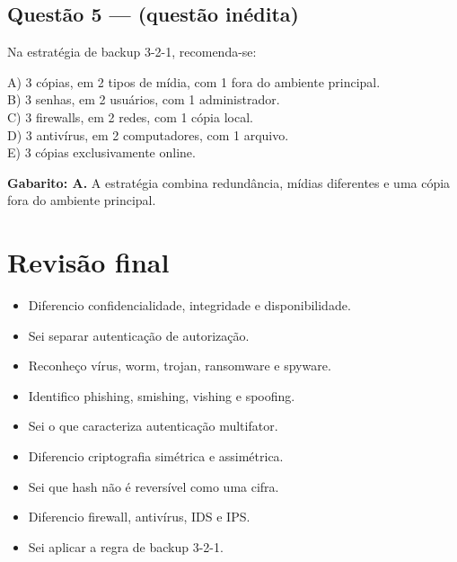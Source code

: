\documentclass[11pt,a4paper]{article}
\begin{document}
\subsection*{Questão 5 — (questão inédita)}

Na estratégia de backup 3-2-1, recomenda-se:

A) 3 cópias, em 2 tipos de mídia, com 1 fora do ambiente principal. \\ B) 3 senhas, em 2 usuários, com 1 administrador. \\ C) 3 firewalls, em 2 redes, com 1 cópia local. \\ D) 3 antivírus, em 2 computadores, com 1 arquivo. \\ E) 3 cópias exclusivamente online.

\begin{alerta}
\textbf{Gabarito: A.} A estratégia combina redundância, mídias diferentes e uma cópia fora do ambiente principal.
\end{alerta}

\section*{Revisão final}

\begin{itemize}
  \item[$\square$] Diferencio confidencialidade, integridade e disponibilidade.
  \item[$\square$] Sei separar autenticação de autorização.
  \item[$\square$] Reconheço vírus, worm, trojan, ransomware e spyware.
  \item[$\square$] Identifico phishing, smishing, vishing e spoofing.
  \item[$\square$] Sei o que caracteriza autenticação multifator.
  \item[$\square$] Diferencio criptografia simétrica e assimétrica.
  \item[$\square$] Sei que hash não é reversível como uma cifra.
  \item[$\square$] Diferencio firewall, antivírus, IDS e IPS.
  \item[$\square$] Sei aplicar a regra de backup 3-2-1.
\end{itemize}
\end{document}
